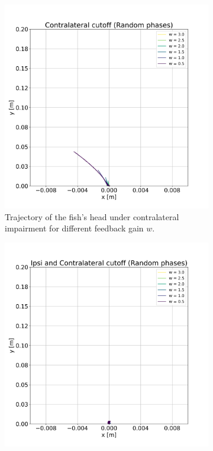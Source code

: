 \documentclass{cmc}
\begin{document}
\begin{figure}[H]
    \centering
    \begin{subfigure}[t]{0.48\linewidth}
        \centering
        \includegraphics[width=\linewidth]{our_figures/Contralateral cutoff_random.png}
        \caption{Trajectory of the fish's head under contralateral impairment for different feedback gain $w$.}
        \label{fig:contra_cutoff_random}
    \end{subfigure}
    \hfill
    \begin{subfigure}[t]{0.48\linewidth}
        \centering
        \includegraphics[width=\linewidth]{our_figures/Ipsi and Contralateral cutoff_random.png}

\end{subfigure}
\end{figure}
\end{document}
